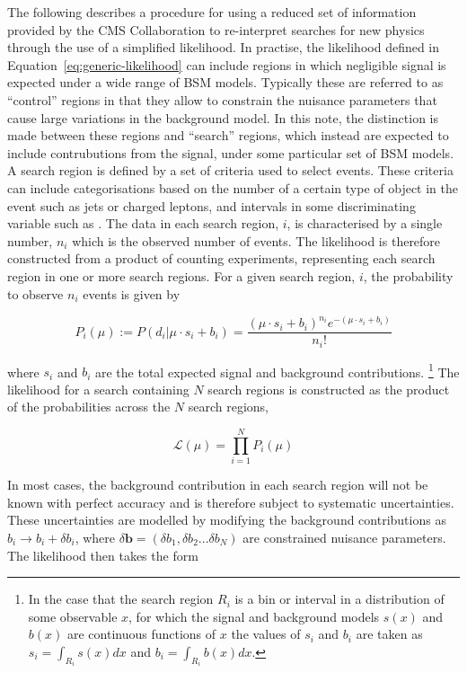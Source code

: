 The following describes a procedure for using a reduced set of information provided by the CMS Collaboration to 
re-interpret searches for new physics through the use of a simplified likelihood. 
In practise, the likelihood defined in Equation~\ref{eq:generic-likelihood} can include regions in which negligible signal is expected under a wide 
range of BSM models. Typically these are referred to as ``control'' regions in that they allow to constrain the nuisance parameters that  
cause large variations in the background model.
In this note, the distinction is made between these regions and ``search'' regions, which instead 
are expected to include contrubutions from the signal, under some particular set of BSM models. A search region 
is defined by a set of criteria used to select events. These criteria can include categorisations based on 
the number of a certain type of object in the event such as jets or 
charged leptons, and intervals in some discriminating variable such as \ptvecmiss. The data in each search region, $i$, is characterised 
by a single number, $n_{i}$ which is the observed number of events. The likelihood is therefore constructed from a product of counting 
experiments, representing each search region in one or more search regions. 
For a given search region, $i$, the probability to observe $n_{i}$ events is given by

\begin{equation}
 P_{i}(\mu) := P(d_{i}|\mu \cdot s_{i}+b_{i}) = \dfrac{(\mu \cdot s_{i}+b_{i})^{n_{i}} e^{-(\mu \cdot s_{i}+b_{i})} }{n_{i}!}
\label{eq:poisson-likelihood}
\end{equation}

where $s_{i}$ and $b_{i}$ are the total expected signal and background contributions.
\footnote{In the case that the search region $R_{i}$ is a bin or interval in a distribution of some observable $x$, for which the signal and background models $s(x)$ 
and $b(x)$ are continuous functions of $x$ the values of $s_{i}$ and $b_{i}$ are taken as 
$s_{i}=\int_{R_{i}} s(x)dx$ and $b_{i}=\int_{R_{i}} b(x)dx$.} 
The likelihood for a search containing $N$ search regions is constructed as the product 
of the probabilities across the $N$ search regions, 

\begin{equation}
\mathcal{L}(\mu) = \prod_{i=1}^{N} P_{i}(\mu)
\label{eq:stat-likelihood}
\end{equation}

In most cases, the background contribution in each search region will not be known with perfect accuracy and is therefore 
subject to systematic uncertainties. These uncertainties are modelled by modifying the background contributions as 
$b_{i}\rightarrow b_{i}+\delta b_{i}$, where $\delta\mathbf{b}=(\delta b_{1},\delta b_{2}...\delta b_{N})$ are constrained nuisance parameters. The likelihood then takes the form

